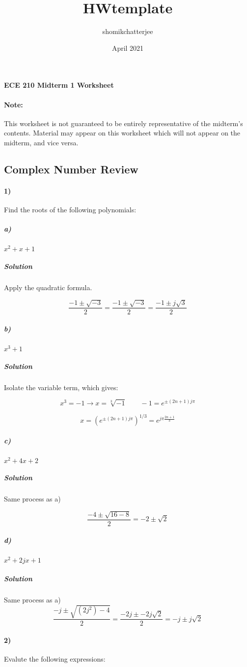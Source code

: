 \documentclass{article}
\title{HWtemplate}
\author{shomikchatterjee }
\date{April 2021}
\begin{document}
\begin{center}
\textbf{
{\Large ECE 210 Midterm 1 Worksheet}
}
\end{center} 
\noindent\makebox[\linewidth]{\rule{\linewidth}{0.4pt}}

\paragraph{Note:} This worksheet is not guaranteed to be entirely representative of the midterm's contents. Material may appear on this worksheet which will not appear on the midterm, and vice versa.

\subsection*{Complex Number Review}

\paragraph{1)} Find the roots of the following polynomials:

\subparagraph{a)} $x^2 + x + 1$

\subparagraph{Solution} Apply the quadratic formula.

\[
\frac{-1\pm\sqrt{-3}}{2} = \frac{-1\pm\sqrt{-3}}{2} = \boxed{\frac{-1\pm j\sqrt{3}}{2}}
\]


\subparagraph{b)} $x^3 + 1$

\subparagraph{Solution} Isolate the variable term, which gives:

\[
x^3 = -1 \rightarrow x = \sqrt[3]{-1} \qquad -1 = e^{\pm(2n+1)j\pi}
\]

\[
 x = (e^{\pm(2n+1) j\pi})^{1/3} = \boxed{e^{j\pi\frac{2n+1}{3}}}
\]	


\subparagraph{c)} $x^2 + 4x + 2$


\subparagraph{Solution} Same process as a)

\[
\frac{-4\pm\sqrt{16-8}}{2} = \boxed{-2 \pm\sqrt{2}}
\]

\subparagraph{d)} $x^2 + 2jx + 1$

\subparagraph{Solution} Same process as a)
\[
\frac{-j\pm\sqrt{(2j^2) - 4}}{2} = \frac{-2j \pm -2j\sqrt{2}}{2} = \boxed{-j\pm j\sqrt{2}}
\]


\newpage

\paragraph{2)} Evalute the following expressions:
\end{document}
